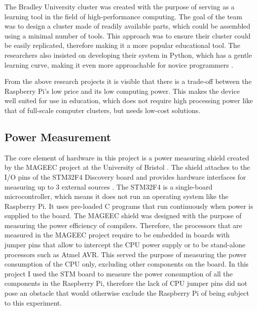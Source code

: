 \documentclass{l4proj}
\begin{document}
\noindent
The Bradley University cluster was created with the purpose of serving as a learning tool in the field of high-performance computing. The goal of the team was to design a cluster made of readily available parts, which could be assembled using a minimal number of tools. This approach was to ensure their cluster could be easily replicated, therefore making it a more popular educational tool. The researchers also insisted on developing their system in Python, which has a gentle learning curve, making it even more approachable for novice programmers \cite{pfalzgraf_driscoll_2014}.

\noindent
From the above research projects it is visible that there is a trade-off between the Raspberry Pi's low price and its low computing power. This makes the device well suited for use in education, which does not require high processing power like that of full-scale computer clusters, but needs low-cost solutions.

\subsection{Power Measurement}
The core element of hardware in this project is a power measuring shield created by the MAGEEC project at the University of Bristol \cite{pallister_2014}. The shield attaches to the I/O pins of the STM32F4 Discovery board and provides hardware interfaces for measuring up to 3 external sources \cite{pallister_hollis_bennett_2012}. The STM32F4 is a single-board microcontroller, which means it does not run an operating system like the Raspberry Pi. It uses pre-loaded C programs that run continuously when power is supplied to the board. The MAGEEC shield was designed with the purpose of measuring the power efficiency of compilers. Therefore, the processors that are measured in the MAGEEC project require to be embedded in boards with jumper pins that allow to intercept the CPU power supply or to be stand-alone processors such as Atmel AVR. This served the purpose of measuring the power consumption of the CPU only, excluding other components on the board. In this project I used the STM board to measure the power consumption of all the components in the Raspberry Pi, therefore the lack of CPU jumper pins did not pose an obstacle that would otherwise exclude the Raspberry Pi of being subject to this experiment.
\end{document}
